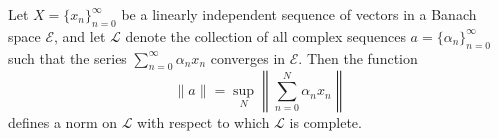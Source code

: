 Let $X = \{x_n\}_{n=0}^{\infty}$ be a linearly independent sequence of vectors in a Banach space $\mathcal{E}$, and let $\mathcal{L}$ denote the collection of all complex sequences $a = \{\alpha_n\}_{n=0}^{\infty}$ such that the series $\sum_{n=0}^{\infty} \alpha_n x_n$ converges in $\mathcal{E}$. Then the function
$$\|a\| = \sup_{N} \left\| \sum_{n=0}^{N} \alpha_n x_n \right\|$$
defines a norm on $\mathcal{L}$ with respect to which $\mathcal{L}$ is complete.
